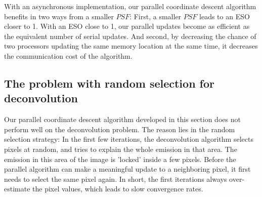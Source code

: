 
With an asynchronous implementation, our parallel coordinate descent algorithm benefits in two ways from a smaller $PSF$: First, a smaller $PSF$ leads to an ESO closer to 1. With an ESO close to 1, our parallel updates become as efficient as the equivalent number of serial updates. And second, by decreasing the chance of two processors updating the same memory location at the same time, it decreases the communication cost of the algorithm.


\subsection{The problem with random selection for deconvolution} \label{pcdm:adaption}
Our parallel coordinate descent algorithm developed in this section does not perform well on the deconvolution problem. The reason lies in the random selection strategy: In the first few iterations, the deconvolution algorithm selects pixels at random, and tries to explain the whole emission in that area. The emission in this area of the image is 'locked' inside a few pixels. Before the parallel algorithm can make a meaningful update to a neighboring pixel, it first needs to select the same pixel again. In short, the first iterations always over-estimate the pixel values, which leads to slow convergence rates. 

